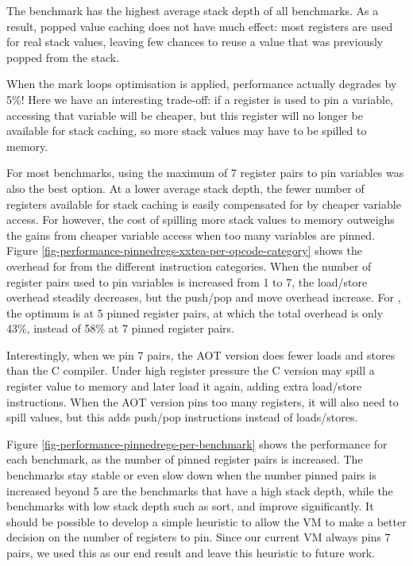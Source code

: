 The  benchmark has the highest average stack depth of all benchmarks. As a result, popped value caching does not have much effect: most registers are used for real stack values, leaving few chances to reuse a value that was previously popped from the stack. 

When the mark loops optimisation is applied, performance actually degrades by 5\%! Here we have an interesting trade-off: if a register is used to pin a variable, accessing that variable will be cheaper, but this register will no longer be available for stack caching, so more stack values may have to be spilled to memory.

For most benchmarks, using the maximum of 7 register pairs to pin variables was also the best option. At a lower average stack depth, the fewer number of registers available for stack caching is easily compensated for by cheaper variable access. For  however, the cost of spilling more stack values to memory outweighs the gains from cheaper variable access when too many variables are pinned. Figure \ref{fig-performance-pinnedregs-xxtea-per-opcode-category} shows the overhead for  from the different instruction categories. When the number of register pairs used to pin variables is increased from 1 to 7, the load/store overhead steadily decreases, but the push/pop and move overhead increase. For , the optimum is at 5 pinned register pairs, at which the total overhead is only 43\%, instead of 58\% at 7 pinned register pairs.

Interestingly, when we pin 7 pairs, the AOT version does fewer loads and stores than the C compiler. Under high register pressure the C version may spill a register value to memory and later load it again, adding extra load/store instructions. When the AOT version pins too many registers, it will also need to spill values, but this adds push/pop instructions instead of loads/stores.

Figure \ref{fig-performance-pinnedregs-per-benchmark} shows the performance for each benchmark, as the number of pinned register pairs is increased. The benchmarks stay stable or even slow down when the number pinned pairs is increased beyond 5 are the benchmarks that have a high stack depth, while the benchmarks with low stack depth such as sort,  and  improve significantly. It should be possible to develop a simple heuristic to allow the VM to make a better decision on the number of registers to pin. Since our current VM always pins 7 pairs, we used this as our end result and leave this heuristic to future work.

